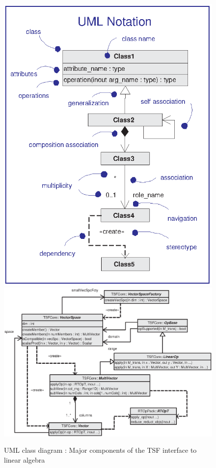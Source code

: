 {\bsinglespace
\begin{figure}[t]
\begin{center}
\includegraphics*[bb= 0.0in 0.0in 3.3in 4.4in,scale=0.40
]{UML1}
\includegraphics*[bb= 0.0in 0.0in 6.55in 4.6in,scale=0.65
]{TSFCore}
\end{center}
\caption{
\label{tsfcore:fig:tsfl_basic}
UML class diagram : Major components of the TSF
interface to linear algebra
}
\end{figure}
\esinglespace}

